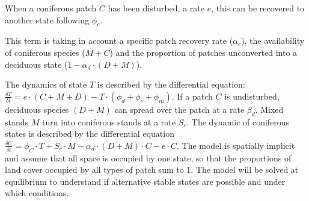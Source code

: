 
When a coniferous patch $C$ has been disturbed, a rate $e$, this can be
recovered to another state following $\phi_c$. 


This term is taking in account a specific patch recovery rate ($\alpha_{c}$),
the availability of coniferous species ($M+C$) and the proportion of patches
unconverted into a deciduous state ($1- \alpha_d \cdot (D +M)$).


The dynamics of state $T$ is described by the differential equation:
$\frac{\delta T}{\delta t} = e \cdot (C+M+D) - T \cdot (\phi_d + \phi_c +
\phi_m)$. If a patch $C$ is undisturbed, deciduous species $(D+M)$ can spread
over the patch at a rate $\beta_d$. Mixed stands $M$ turn into
coniferous stands at a rate $S_c$.  The dynamic of coniferous states is described by the
differential equation $\frac{\delta C}{\delta t} = \phi_C \cdot T + S_c \cdot
M - \alpha_d \cdot (D+M)\cdot C - e \cdot C$. The model is spatially implicit and assume that all space is occupied by one
state, so that the proportions of land cover occupied by all types of patch
sum to 1. The model will be solved at equilibrium to understand if
alternative stable states are possible and under which conditions.\\


